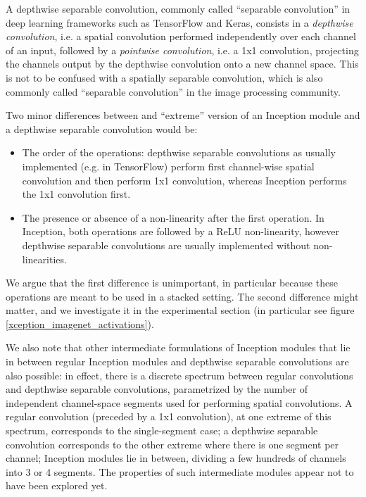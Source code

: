 \documentclass[10pt,twocolumn,letterpaper]{article}
\begin{document}
A depthwise separable convolution, commonly called ``separable convolution'' in deep learning frameworks such as TensorFlow and Keras, consists in a \textit{depthwise convolution}, i.e. a spatial convolution performed independently over each channel of an input, followed by a \textit{pointwise convolution}, i.e. a 1x1 convolution, projecting the channels output by the depthwise convolution onto a new channel space. This is not to be confused with a spatially separable convolution, which is also commonly called ``separable convolution'' in the image processing community.

Two minor differences between and ``extreme'' version of an Inception module and a depthwise separable convolution would be:

\begin{itemize}
  \item The order of the operations: depthwise separable convolutions as usually implemented (e.g. in TensorFlow) perform first channel-wise spatial convolution and then perform 1x1 convolution, whereas Inception performs the 1x1 convolution first.
  \item The presence or absence of a non-linearity after the first operation. In Inception, both operations are followed by a ReLU non-linearity, however depthwise separable convolutions are usually implemented without non-linearities.
\end{itemize}

We argue that the first difference is unimportant, in particular because these operations are meant to be used in a stacked setting. The second difference might matter, and we investigate it in the experimental section (in particular see figure \ref{xception_imagenet_activations}).

We also note that other intermediate formulations of Inception modules that lie in between regular Inception modules and depthwise separable convolutions are also possible: in effect, there is a discrete spectrum between regular convolutions and depthwise separable convolutions, parametrized by the number of independent channel-space segments used for performing spatial convolutions. A regular convolution (preceded by a 1x1 convolution), at one extreme of this spectrum, corresponds to the single-segment case; a depthwise separable convolution corresponds to the other extreme where there is one segment per channel; Inception modules lie in between, dividing a few hundreds of channels into 3 or 4 segments. The properties of such intermediate modules appear not to have been explored yet.
\end{document}
